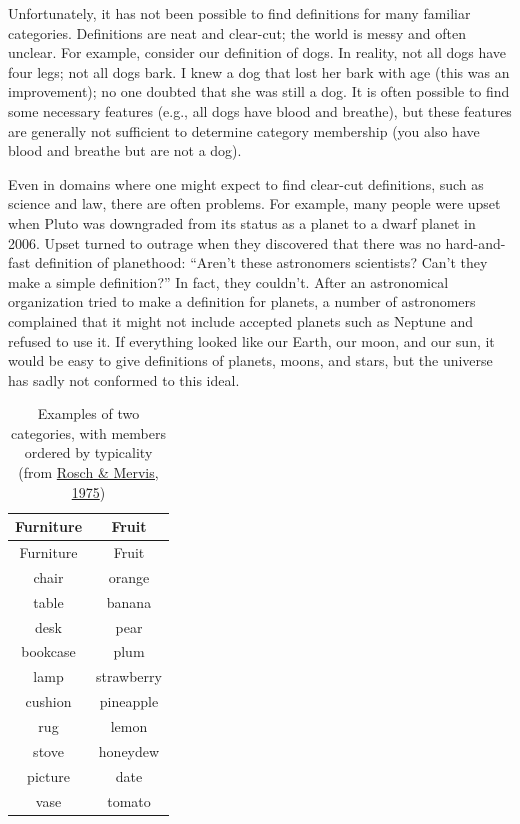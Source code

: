 \documentclass[
]{krantz}
\begin{document}
Unfortunately, it has not been possible to find definitions for many familiar categories. Definitions are neat and clear-cut; the world is messy and often unclear. For example, consider our definition of dogs. In reality, not all dogs have four legs; not all dogs bark. I knew a dog that lost her bark with age (this was an improvement); no one doubted that she was still a dog. It is often possible to find some necessary features (e.g., all dogs have blood and breathe), but these features are generally not sufficient to determine category membership (you also have blood and breathe but are not a dog).

Even in domains where one might expect to find clear-cut definitions, such as science and law, there are often problems. For example, many people were upset when Pluto was downgraded from its status as a planet to a dwarf planet in 2006. Upset turned to outrage when they discovered that there was no hard-and-fast definition of planethood: ``Aren't these astronomers scientists? Can't they make a simple definition?'' In fact, they couldn't. After an astronomical organization tried to make a definition for planets, a number of astronomers complained that it might not include accepted planets such as Neptune and refused to use it. If everything looked like our Earth, our moon, and our sun, it would be easy to give definitions of planets, moons, and stars, but the universe has sadly not conformed to this ideal.

\begin{longtable}[]{@{}cc@{}}
\caption{\label{tab:typicality} Examples of two categories, with members ordered by typicality (from \protect\hyperlink{ref-Rosch1975}{Rosch \& Mervis, 1975})}\tabularnewline
\toprule\noalign{}
Furniture & Fruit \\
\midrule\noalign{}
\endfirsthead
\toprule\noalign{}
Furniture & Fruit \\
\midrule\noalign{}
\endhead
\bottomrule\noalign{}
\endlastfoot
chair & orange \\
table & banana \\
desk & pear \\
bookcase & plum \\
lamp & strawberry \\
cushion & pineapple \\
rug & lemon \\
stove & honeydew \\
picture & date \\
vase & tomato \\
\end{longtable}
\end{document}
